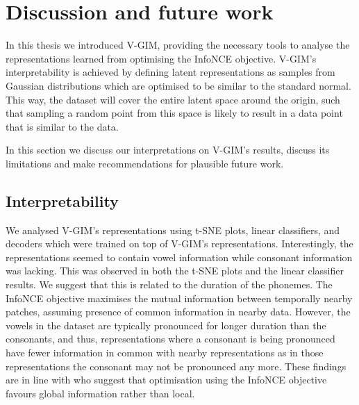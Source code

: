 \chapter{Discussion and future work}

	
In this thesis we introduced V-GIM, providing the necessary tools to analyse the representations learned from optimising the InfoNCE objective.
V-GIM's interpretability is achieved by defining latent representations as samples from Gaussian distributions which are optimised to be similar to the standard normal. This way, the dataset will cover the entire latent space around the origin, such that sampling a random point from this space is likely to result in a data point that is similar to the data. 


In this section we discuss our interpretations on V-GIM's results, discuss its limitations and make recommendations for plausible future work.

\section{Interpretability}
	
	We analysed V-GIM's representations using t-SNE plots, linear classifiers, and decoders which were trained on top of V-GIM's representations. Interestingly, the representations seemed to contain vowel information while consonant information was lacking. This was observed in both the t-SNE plots and the linear classifier results. We suggest that this is related to the duration of the phonemes. The InfoNCE objective maximises the mutual information between temporally nearby patches, assuming presence of common information in nearby data. However, the vowels in the dataset are typically pronounced for longer duration than the consonants, and thus, representations where a consonant is being pronounced have fewer information in common with nearby representations as in those representations the consonant may not be pronounced any more. These findings are in line with \cite{lowePuttingEndEndtoEnd2020} who suggest that optimisation using the InfoNCE objective favours global information rather than local. 
	

